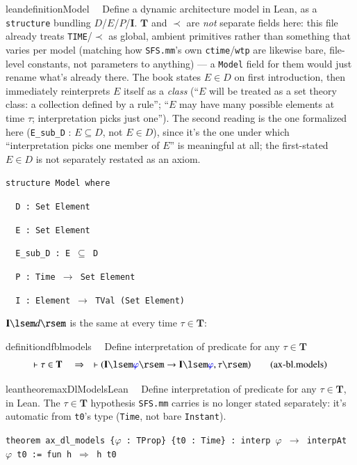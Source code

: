 \begin{restatable}{leandefinition}{Model}~~ Define a dynamic architecture model in Lean, as a
\texttt{structure} bundling $D$/$E$/$P$/$\mathbf{I}$. $\mathbf{T}$ and $\prec$ are \emph{not} separate fields
here: this file already treats \texttt{TIME}/$\prec$ as global, ambient primitives rather than something that
varies per model (matching how \texttt{SFS.mm}'s own \texttt{ctime}/\texttt{wtp} are likewise bare, file-level
constants, not parameters to anything) --- a \texttt{Model} field for them would just rename what's already
there. The book states $E\in D$ on first introduction, then immediately reinterprets $E$ itself as a
\emph{class} (``$E$ will be treated as a set theory class: a collection defined by a rule''; ``$E$ may have
many possible elements at time $\tau$; interpretation picks just one''). The second reading is the one
formalized here (\texttt{E\_sub\_D} : $E\subseteq D$, not $E\in D$), since it's the one under which
``interpretation picks one member of $E$'' is meaningful at all; the first-stated $E\in D$ is not separately
restated as an axiom.

\texttt{\textcolor{leancolor}{structure} \textcolor{leanyellow}{Model} \textcolor{leancolor}{where}}

\texttt{~~D : Set Element}

\texttt{~~E : Set Element}

\texttt{~~E\_sub\_D : E $\subseteq$ D}

\texttt{~~P : Time $\to$ Set Element}

\texttt{~~I : Element $\to$ TVal (Set Element)}
\label{Model}
\end{restatable}

\pn  $\mathbf{I}\lsem d \rsem$ is the same at every time $\tau\in\mathbf{T}$:
 
 \begin{restatable}{definition}{dfblmodels}~~ Define interpretation of predicate for
any $\tau \in \mathbf{T}$
\begin{align}
\vdash \tau \in \mathbf{T}\quad\Rightarrow\quad \vdash ( \mathbf{I} \lsem
    \mw{\varphi} \rsem \rightarrow \mathbf{I} \lsem \mw{\varphi} , \tau \rsem
    )\label{eq:df-bl.models}\tag{ax-bl.models}
\end{align}
\end{restatable}

\begin{restatable}{leantheorem}{axDlModelsLean}~~ Define interpretation of predicate
for any $\tau\in\mathbf{T}$, in Lean. The $\tau\in\mathbf{T}$ hypothesis \texttt{SFS.mm} carries is no longer
stated separately: it's automatic from \texttt{t0}'s type (\texttt{Time}, not bare \texttt{Instant}).

\texttt{\textcolor{leancolor}{theorem} \textcolor{leanyellow}{ax\_dl\_models} \{$\varphi$ : TProp\} \{t0 : Time\} : interp $\varphi$ $\to$ interpAt $\varphi$ t0 := fun h $\Rightarrow$ h t0}
\label{ax_dl_models}
\end{restatable}

